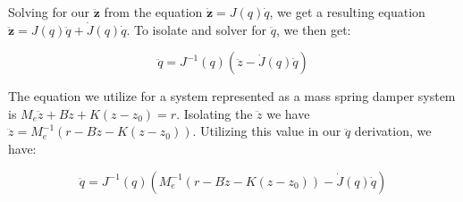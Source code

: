 \documentclass{article}
\begin{document}
Solving for our $\boldsymbol{\ddot{z}}$ from the equation $\boldsymbol{\dot{z}} = J(q) \dot{q}$, we get a resulting equation $\boldsymbol{\ddot{z}} = J(q) \ddot{q} + \dot{J}(q) \dot{q}$. To isolate and solver for $\ddot{q}$, we then get:

\begin{equation}
    \ddot{q} = J^{-1}(q) \left( \ddot{z} - \dot{J}(q)\dot{q}  \right)
\end{equation}

The equation we utilize for a system represented as a mass spring damper system is $M_e \ddot{z} + B \dot{z} + K(z-z_0) = r$. Isolating the $\ddot{z}$ we have $\ddot{z} = M_e^{-1}\left( r - B \dot{z} - K(z-z_0) \right)$. Utilizing this value in our $\ddot{q}$ derivation, we have:

\begin{equation}
    \ddot{q} = J^{-1}(q) \left( M_e^{-1}\left( r - B \dot{z} - K(z-z_0) \right) - \dot{J}(q)\dot{q}  \right) 
\end{equation}
\end{document}
